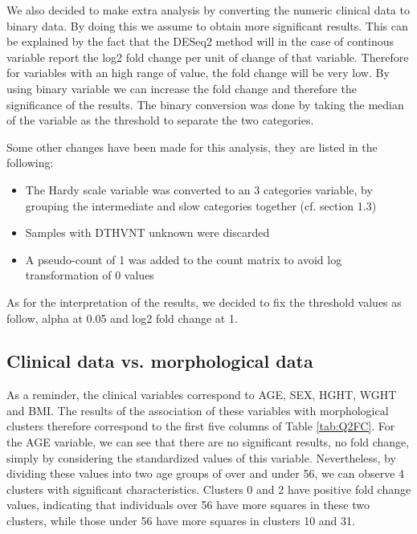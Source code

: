 \documentclass[a4paper, 11pt]{article}
\begin{document}
\begin{multicols}{2}
We also decided to make extra analysis by converting the numeric clinical data to binary data. By doing this we assume to obtain more significant results. 
This can be explained by the fact that the DESeq2 method will in the case of continous variable report the log2 fold change per unit of change of that variable.
Therefore for variables with an high range of value, the fold change will be very low. By using binary variable we can increase the fold change and therefore the significance of the results.
The binary conversion was done by taking the median of the variable as the threshold to separate the two categories.

Some other changes have been made for this analysis, they are listed in the following:
\begin{itemize}
	\item  The Hardy scale variable was converted to an 3 categories variable, by grouping the intermediate and slow categories together (cf. section 1.3)
	\item  Samples with DTHVNT unknown were discarded
	\item  A pseudo-count of 1 was added to the count matrix to avoid log transformation of 0 values
\end{itemize}


As for the interpretation of the results, we decided to fix the threshold values as follow, alpha at 0.05 and log2 fold change at 1.


\subsection{Clinical data vs. morphological data}


As a reminder, the clinical variables correspond to AGE, SEX, HGHT, WGHT and BMI. The results of the association of these variables with morphological clusters therefore correspond to the first five columns of Table \ref{tab:Q2FC}.
For the AGE variable, we can see that there are no significant results, no fold change, simply by considering the standardized values of this variable. Nevertheless, by dividing these values into two age groups of over and under 56, we can observe 4 clusters with significant characteristics. Clusters 0 and 2 have positive fold change values, indicating that individuals over 56 have more squares in these two clusters, while those under 56 have more squares in clusters 10 and 31.


\end{multicols}
\end{document}
